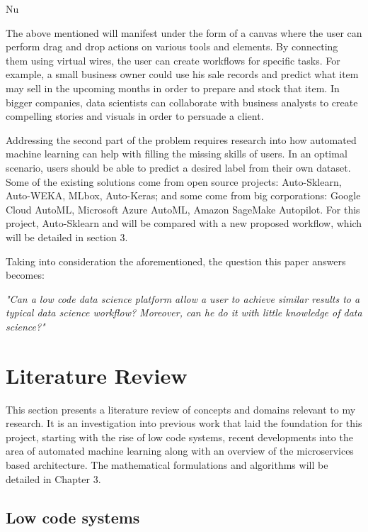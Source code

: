 Nu\documentclass[11pt,twoside, a4paper]{report}
\begin{document}
The above mentioned will manifest under the form of a canvas where the user can perform drag and drop actions on various tools and elements. By connecting them using virtual wires, the user can create workflows for specific tasks. For example, a small business owner could use his sale records and predict what item may sell in the upcoming months in order to prepare and stock that item. In bigger companies, data scientists can collaborate with business analysts to create compelling stories and visuals in order to persuade a client.

Addressing the second part of the problem requires research into how automated machine learning can help with filling the missing skills of users. In an optimal scenario, users should be able to predict a desired label from their own dataset. Some of the existing solutions come from open source projects: Auto-Sklearn, Auto-WEKA, MLbox, Auto-Keras; and some come from big corporations: Google Cloud AutoML, Microsoft Azure AutoML, Amazon SageMake Autopilot. For this project, Auto-Sklearn and will be compared with a new proposed workflow, which will be detailed in section 3. 

\noindent Taking into consideration the aforementioned, the question this paper answers becomes:

\begin{center}
    {\it "Can a low code data science platform allow a user to achieve similar results to a typical data science workflow? Moreover, can he do it with little knowledge of data science?"}
\end{center}


\chapter{Literature Review}
This section presents a literature review of concepts and domains relevant to my research. It is an investigation into previous work that laid the foundation for this project, starting with the rise of low code systems, recent developments into the area of automated machine learning along with an overview of the microservices based architecture. The mathematical formulations and algorithms will be detailed in Chapter 3.

\section{Low code systems}
\end{document}
